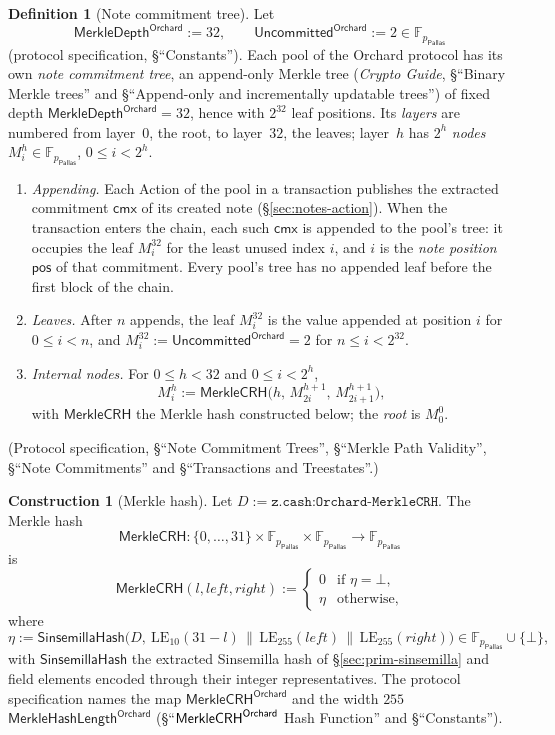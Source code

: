 \documentclass[11pt,a4paper]{article}
\theoremstyle{definition}
\newtheorem{definition}[theorem]{Definition}
\newtheorem{construction}[theorem]{Construction}
\newcommand{\F}{\mathbb{F}}
\newcommand{\cmx}{\mathsf{cmx}}
\newcommand{\Pallas}{\ensuremath{\mathsf{Pallas}}}
\begin{document}
\begin{definition}[Note commitment tree]
Let
\[
  \mathsf{MerkleDepth}^{\mathsf{Orchard}} := 32, \qquad
  \mathsf{Uncommitted}^{\mathsf{Orchard}} := 2 \in \F_{p_{\Pallas}}
\]
(protocol specification, \S``Constants''). Each pool of the Orchard
protocol has its own \emph{note commitment tree}, an append-only Merkle tree
(\emph{Crypto Guide}, \S``Binary Merkle trees'' and \S``Append-only and
incrementally updatable trees'') of fixed depth
$\mathsf{MerkleDepth}^{\mathsf{Orchard}} = 32$, hence with $2^{32}$ leaf
positions. Its \emph{layers} are numbered from layer~$0$, the root, to
layer~$32$, the leaves; layer~$h$ has $2^h$ \emph{nodes}
$M^h_i \in \F_{p_{\Pallas}}$, $0 \le i < 2^h$.
\begin{enumerate}
\item \emph{Appending.} Each Action of the pool in a transaction publishes
  the extracted commitment $\cmx$ of its created note
  (\S\ref{sec:notes-action}). When the transaction enters the chain, each
  such $\cmx$ is appended to the pool's tree: it occupies the leaf
  $M^{32}_i$ for the least unused index $i$, and $i$ is the \emph{note
  position} $\mathsf{pos}$ of that commitment. Every pool's tree has no
  appended leaf before the first block of the chain.
\item \emph{Leaves.} After $n$ appends, the leaf $M^{32}_i$ is the value
  appended at position $i$ for $0 \le i < n$, and
  $M^{32}_i := \mathsf{Uncommitted}^{\mathsf{Orchard}} = 2$ for
  $n \le i < 2^{32}$.
\item \emph{Internal nodes.} For $0 \le h < 32$ and $0 \le i < 2^h$,
  \[
    M^h_i := \mathsf{MerkleCRH}\bigl(h,\, M^{h+1}_{2i},\,
      M^{h+1}_{2i+1}\bigr),
  \]
  with $\mathsf{MerkleCRH}$ the Merkle hash constructed below; the
  \emph{root} is $M^0_0$.
\end{enumerate}
(Protocol specification, \S``Note Commitment Trees'', \S``Merkle Path
Validity'', \S``Note Commitments'' and \S``Transactions and Treestates''.)
\end{definition}

\begin{construction}[Merkle hash]
Let $D := \texttt{z.cash:Orchard-MerkleCRH}$. The Merkle hash
\[
  \mathsf{MerkleCRH} \colon \{0, \dots, 31\} \times \F_{p_{\Pallas}}
    \times \F_{p_{\Pallas}} \to \F_{p_{\Pallas}}
\]
is
\[
  \mathsf{MerkleCRH}(l, \mathit{left}, \mathit{right}) :=
  \begin{cases}
    0 & \text{if } \eta = \bot, \\
    \eta & \text{otherwise},
  \end{cases}
\]
where
\[
  \eta := \mathsf{SinsemillaHash}\bigl(D,\ \mathrm{LE}_{10}(31 - l)
    \,\|\, \mathrm{LE}_{255}(\mathit{left})
    \,\|\, \mathrm{LE}_{255}(\mathit{right})\bigr)
    \in \F_{p_{\Pallas}} \cup \{\bot\},
\]
with $\mathsf{SinsemillaHash}$ the extracted Sinsemilla hash of
\S\ref{sec:prim-sinsemilla} and field elements encoded through their integer
representatives. The protocol specification names the map
$\mathsf{MerkleCRH}^{\mathsf{Orchard}}$ and the width $255$
$\mathsf{MerkleHashLength}^{\mathsf{Orchard}}$ (\S``$\mathsf{MerkleCRH}^{%
\mathsf{Orchard}}$ Hash Function'' and \S``Constants'').
\end{construction}
\end{document}
